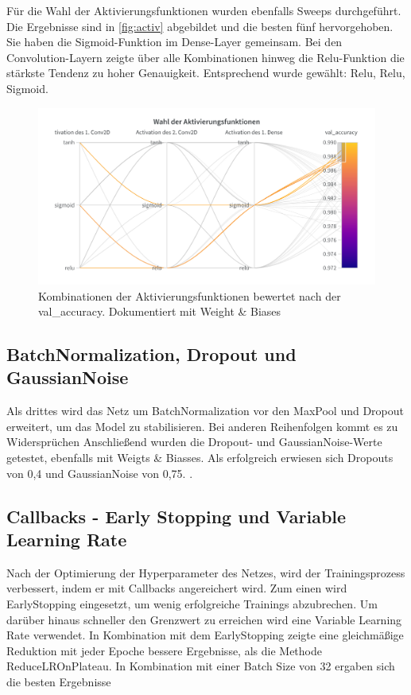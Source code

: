 \documentclass[
fontsize=12pt,					%
paper=a4,						%
twoside=false, 					%
listof=totoc, 					%
bibliography=totoc,				%
titlepage, 						%
headsepline, 					%
DIV=12,							%
BCOR=6mm,						%
cleardoublepage=empty,			%
parskip,							%
ngerman
]{scrartcl}
\begin{document}
Für die Wahl der Aktivierungsfunktionen wurden ebenfalls Sweeps durchgeführt. Die Ergebnisse sind in \autoref{fig:activ} abgebildet und die besten fünf hervorgehoben. Sie haben die Sigmoid-Funktion im Dense-Layer gemeinsam. Bei den Convolution-Layern zeigte über alle Kombinationen hinweg die Relu-Funktion die stärkste Tendenz zu hoher Genauigkeit. Entsprechend wurde gewählt: Relu, Relu, Sigmoid.

\begin{figure}[h]
	\centering
	\includegraphics[width=0.7\linewidth]{images/Activ}
	\caption{Kombinationen der Aktivierungsfunktionen bewertet nach der val\_accuracy. Dokumentiert mit Weight \& Biases}
	\label{fig:activ}
\end{figure}

\subsection{BatchNormalization, Dropout und GaussianNoise}

Als drittes wird das Netz um BatchNormalization vor den MaxPool und Dropout erweitert, um das Model zu stabilisieren. Bei anderen Reihenfolgen kommt es zu Widersprüchen \autocite{Li.2018} Anschließend wurden die Dropout- und GaussianNoise-Werte getestet, ebenfalls mit Weigts \& Biasses. Als erfolgreich erwiesen sich Dropouts von 0,4 und GaussianNoise von 0,75. \autocite{Cai.2020}.

\subsection{Callbacks - Early Stopping und Variable Learning Rate}

Nach der Optimierung der Hyperparameter des Netzes, wird der Trainingsprozess verbessert, indem er mit Callbacks angereichert wird. Zum einen wird EarlyStopping eingesetzt, um wenig erfolgreiche Trainings abzubrechen. Um darüber hinaus schneller den Grenzwert zu erreichen wird eine Variable Learning Rate verwendet. In Kombination mit dem EarlyStopping zeigte eine gleichmäßige Reduktion mit jeder Epoche bessere Ergebnisse, als die Methode ReduceLROnPlateau. In Kombination mit einer Batch Size von 32 ergaben sich die besten Ergebnisse
\end{document}

